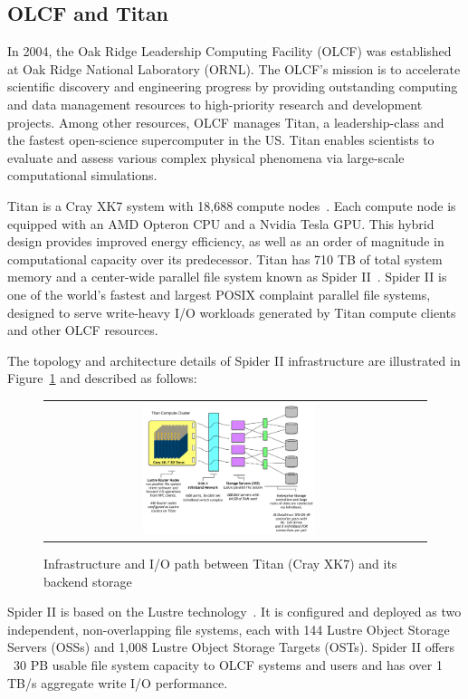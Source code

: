 \subsection{OLCF and Titan}

In 2004, the Oak Ridge Leadership Computing Facility (OLCF) was established at
Oak Ridge National Laboratory (ORNL). The OLCF's mission is to accelerate
scientific discovery and engineering progress by providing outstanding computing
and data management resources to high-priority research and development
projects. Among other resources, OLCF manages Titan, a leadership-class and the
fastest open-science supercomputer in the US. Titan enables scientists to
evaluate and assess various complex physical phenomena via large-scale
computational simulations.

Titan is a Cray XK7 system with 18,688 compute nodes~\cite{top500}. Each compute
node is equipped with an AMD Opteron CPU and a Nvidia Tesla GPU. This hybrid
design provides improved energy efficiency, as well as an order of magnitude in
computational capacity over its predecessor. Titan has 710 TB of total system
memory and a center-wide parallel file system known as Spider II~\cite{spider2}.
Spider II is one of the world's fastest and largest POSIX complaint parallel
file systems, designed to serve write-heavy I/O workloads generated by Titan
compute clients and other OLCF resources.


The topology and architecture details of Spider II infrastructure are
illustrated in Figure~\ref{fig:xk7-compute-node} and
described as follows:


\begin{figure}[!htb]
    \centering
    \begin{tabular}{cc}
        {\includegraphics[width=0.48\textwidth]{figures/spider2arch.pdf}}\\
    \end{tabular}
    \caption{Infrastructure and I/O path between Titan (Cray XK7) and its backend storage}
    \label{fig:xk7-compute-node}
\end{figure}



Spider II is based on the Lustre technology~\cite{lustre}.  It is configured
and deployed as two independent, non-overlapping file systems, each with 144
Lustre Object Storage Servers (OSSs) and 1,008 Lustre Object Storage Targets
(OSTs). Spider II offers ~30 PB usable file system capacity to OLCF systems and
users and has over 1 TB/s aggregate write I/O performance.
